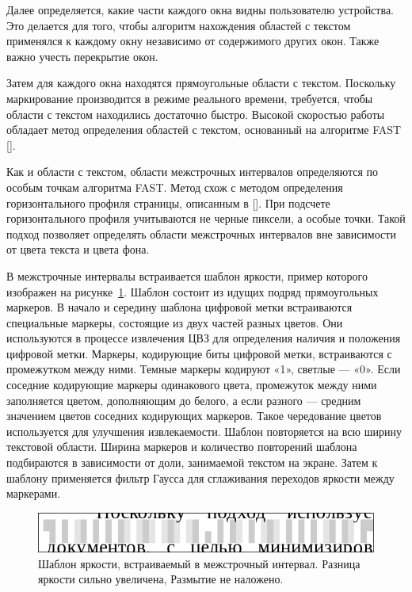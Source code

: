 \documentclass[12pt,a4paper]{article}
\begin{document}
Далее определяется, какие части каждого окна видны пользователю устройства. Это делается для того, чтобы алгоритм нахождения областей с текстом применялся к каждому окну независимо от содержимого других окон.
Также важно учесть перекрытие окон.

Затем для каждого окна находятся прямоугольные области с текстом.
Поскольку маркирование производится в режиме реального времени, требуется, чтобы области с текстом находились достаточно быстро.
Высокой скоростью работы обладает метод определения областей с текстом, основанный на алгоритме FAST [].

Как и области с текстом, области межстрочных интервалов определяются по особым точкам алгоритма FAST.
Метод схож с методом определения горизонтального профиля страницы, описанным в [].
При подсчете горизонтального профиля учитываются не черные пиксели, а особые точки.
Такой подход позволяет определять области межстрочных интервалов вне зависимости от цвета текста и цвета фона.

В межстрочные интервалы встраивается шаблон яркости, пример которого изображен на рисунке~\ref{fig:template}.
Шаблон состоит из идущих подряд прямоугольных маркеров.
В начало и середину шаблона цифровой метки встраиваются специальные маркеры, состоящие из двух частей разных цветов.
Они используются в процессе извлечения ЦВЗ для определения наличия и положения цифровой метки.
Маркеры, кодирующие биты цифровой метки, встраиваются с промежутком между ними.
Темные маркеры кодируют «1», светлые — «0».
Если соседние кодирующие маркеры одинакового цвета, промежуток между ними заполняется цветом, дополняющим до белого, а если разного — средним значением цветов соседних кодирующих маркеров.
Такое чередование цветов используется для улучшения извлекаемости.
Шаблон повторяется на всю ширину текстовой области.
Ширина маркеров и количество повторений шаблона подбираются в зависимости от доли, занимаемой текстом на экране.
Затем к шаблону применяется фильтр Гаусса для сглаживания переходов яркости между маркерами.
\begin{figure}[h]
	
	\centering
	
	\includegraphics[width=0.8\linewidth]{template.png}
	
	\caption{Шаблон яркости, встраиваемый в межстрочный интервал. Разница яркости сильно увеличена, Размытие не наложено.}
	
	\label{fig:template}
	
\end{figure}
\end{document}
